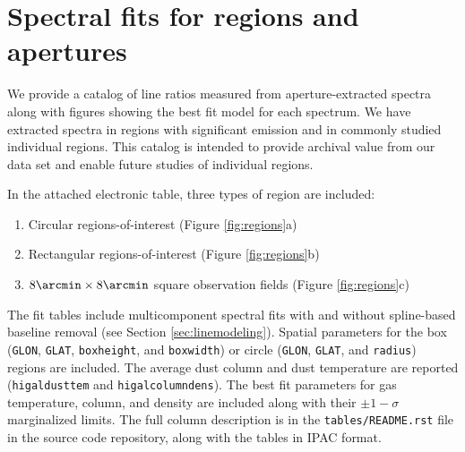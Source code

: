 

\section{Spectral fits for regions and apertures}
We provide a catalog of line ratios measured from aperture-extracted spectra
along with figures showing the best fit model for each spectrum.  We have
extracted spectra in regions with significant \para emission and in commonly
studied individual regions.  This catalog is intended to provide archival value
from our data set and enable future studies of individual regions.

In the attached electronic table, three types of region are included: 
\begin{enumerate}
    \item Circular regions-of-interest (Figure \ref{fig:regions}a)
    \item Rectangular regions-of-interest (Figure \ref{fig:regions}b)
    \item $8\arcmin \times 8\arcmin$ square observation fields (Figure \ref{fig:regions}c)
\end{enumerate}
The fit tables include multicomponent spectral fits with and without
spline-based baseline removal (see Section \ref{sec:linemodeling}).
Spatial parameters for the box (\texttt{GLON}, \texttt{GLAT},
\texttt{boxheight}, and \texttt{boxwidth}) or circle (\texttt{GLON},
\texttt{GLAT}, and \texttt{radius}) regions are included.  The average dust
column and dust temperature are reported (\texttt{higaldusttem} and
\texttt{higalcolumndens}).  The best fit parameters for gas temperature, \para
column, and \hh density are included along with their $\pm1-\sigma$ marginalized
limits.  The full column description is in the \texttt{tables/README.rst} file
in the source code repository, along with the tables in IPAC format.

